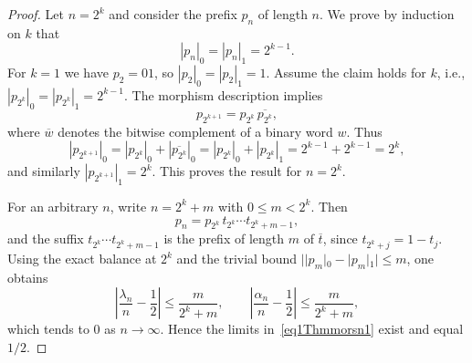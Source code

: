 \documentclass[10pt,a4paper]{amsart}
\begin{document}
\begin{proof}
Let $n=2^k$ and consider the prefix $p_n$ of length $n$. We prove by induction on $k$ that
\[
|p_n|_0 = |p_n|_1 = 2^{k-1}.
\]
For $k=1$ we have $p_2=01$, so $|p_2|_0 = |p_2|_1 = 1$. Assume the claim holds for $k$, i.e., $|p_{2^k}|_0 = |p_{2^k}|_1 = 2^{k-1}$. The morphism description implies
\[
p_{2^{k+1}} = p_{2^k}\,\overline{p_{2^k}},
\]
where $\overline{w}$ denotes the bitwise complement of a binary word $w$. Thus
\[
|p_{2^{k+1}}|_0 = |p_{2^k}|_0 + |\overline{p_{2^k}}|_0 = |p_{2^k}|_0 + |p_{2^k}|_1 = 2^{k-1} + 2^{k-1} = 2^k,
\]
and similarly $|p_{2^{k+1}}|_1 = 2^k$. This proves the result for $n=2^k$.

For an arbitrary $n$, write $n=2^k + m$ with $0\le m<2^k$. Then
\[
p_n = p_{2^k}\, t_{2^k}\cdots t_{2^k+m-1},
\]
and the suffix $t_{2^k}\cdots t_{2^k+m-1}$ is the prefix of length $m$ of $\overline{t}$, since $t_{2^k+j}=1-t_j$. Using the exact balance at $2^k$ and the trivial bound $||p_m|_0-|p_m|_1|\le m$, one obtains
\[
\left|\frac{\lambda_n}{n} - \frac{1}{2}\right| \le \frac{m}{2^k+m},\qquad
\left|\frac{\alpha_n}{n} - \frac{1}{2}\right| \le \frac{m}{2^k+m},
\]
which tends to $0$ as $n\to\infty$. Hence the limits in~\eqref{eq1Thmmorsn1} exist and equal $1/2$.
\end{proof}
\end{document}
